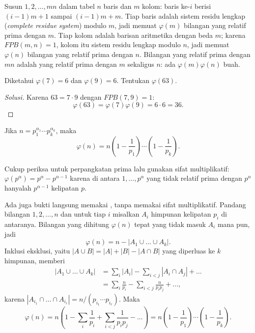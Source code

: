 \documentclass[12pt]{scrartcl}
\begin{document}
Susun $1, 2, \dots, mn$ dalam tabel $n$ baris dan $m$ kolom:
baris ke-$i$ berisi $(i-1)m + 1$ sampai $(i-1)m + m$.
Tiap baris adalah sistem residu lengkap (\textit{complete residue system}) modulo $m$,
jadi memuat $\varphi(m)$ bilangan yang relatif prima dengan $m$.
Tiap kolom adalah barisan aritmetika dengan beda $m$;
karena $FPB(m, n) = 1$, kolom itu sistem residu lengkap modulo $n$,
jadi memuat $\varphi(n)$ bilangan yang relatif prima dengan $n$.
Bilangan yang relatif prima dengan $mn$ adalah yang relatif prima
dengan $m$ sekaligus $n$: ada $\varphi(m)\varphi(n)$ buah.

\begin{example}
Diketahui $\varphi(7) = 6$ dan $\varphi(9) = 6$. Tentukan $\varphi(63)$.
\end{example}
\begin{proof}[Solusi]
Karena $63 = 7 \cdot 9$ dengan $FPB(7, 9) = 1$:
\[ \varphi(63) = \varphi(7)\varphi(9) = 6 \cdot 6 = 36. \]
\end{proof}

\begin{theorem}
Jika $n = p_1^{\alpha_1} \cdots p_k^{\alpha_k}$, maka
\[ \varphi(n) = n\left(1 - \frac{1}{p_1}\right) \cdots \left(1 - \frac{1}{p_k}\right). \]
\end{theorem}

Cukup periksa untuk perpangkatan prima lalu gunakan sifat multiplikatif:
$\varphi(p^\alpha) = p^\alpha - p^{\alpha-1}$ karena di antara $1, \dots, p^\alpha$
yang tidak relatif prima dengan $p^\alpha$ hanyalah $p^{\alpha-1}$ kelipatan $p$.

Ada juga bukti langsung memakai ,
tanpa memakai sifat multiplikatif. Pandang bilangan $1, 2, \dots, n$ dan untuk tiap $i$
misalkan $A_i$ himpunan kelipatan $p_i$ di antaranya. Bilangan yang dihitung $\varphi(n)$
tepat yang tidak masuk $A_i$ mana pun, jadi
\[ \varphi(n) = n - |A_1 \cup \dots \cup A_k|. \]
Inklusi eksklusi, yaitu $|A \cup B| = |A| + |B| - |A \cap B|$ yang diperluas
ke $k$ himpunan, memberi
\begin{align*}
|A_1 \cup \dots \cup A_k|
&= \sum_i |A_i| - \sum_{i<j} |A_i \cap A_j| + \dots \\
&= \sum_i \frac{n}{p_i} - \sum_{i<j} \frac{n}{p_ip_j} + \dots,
\end{align*}
karena $|A_{i_1} \cap \dots \cap A_{i_r}| = n/(p_{i_1} \cdots p_{i_r})$.
Maka
\[ \varphi(n) = n\left(1 - \sum_i \frac{1}{p_i} + \sum_{i<j} \frac{1}{p_ip_j}
- \dots\right) = n\left(1 - \frac{1}{p_1}\right) \cdots \left(1 - \frac{1}{p_k}\right). \]
\end{document}
